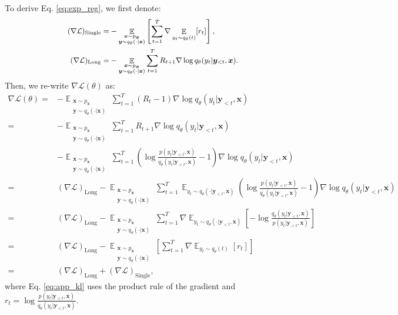 \documentclass{article}
\def\expct{\mathop{\mathbb{E}}}
\def\pst{q_{\theta}(y_t | \by_{<t}, \bx)}
\def\ptt{p(y_t | \by_{<t}, \bx)}
\def\ps{q_\theta}
\def\bx{\bm{x}}
\def\by{\bm{y}}
\begin{document}
To derive Eq. \ref{eq:exp_reg}, we first denote: 
\begin{equation}
    \small
    \begin{aligned}
    (\nabla \mathcal{L})_{\text{Single}}=&-\expct_{\substack{\bx \sim p_{\bx} \\ \by \sim \ps (\cdot | \bx)}} \left[ \sum_{t=1}^T\nabla \expct_{y_t \sim q_\theta (t)}[r_t]\right], \\
    (\nabla \mathcal{L})_{\text{Long}} =& -\expct_{\substack{\bx \sim p_{\bx} \\ \by \sim \ps (\cdot | \bx)}} \sum_{t=1}^T R_{t+1} \nabla \log \pst.
\end{aligned}
\end{equation}
Then, we re-write $\nabla \mathcal{L}(\theta)$ as:
{\small
\begin{align}
    \nabla \mathcal{L}(\theta) 
    =& -\expct_{\substack{\bx \sim p_{\bx} \\ \by \sim \ps (\cdot | \bx)}} \sum_{t=1}^T (R_t - 1) \nabla \log \pst \\
    =& -\expct_{\substack{\bx \sim p_{\bx} \\ \by \sim \ps (\cdot | \bx)}} \sum_{t=1}^T R_{t+1} \nabla \log \pst \\
    &- \expct_{\substack{\bx \sim p_{\bx} \\ \by \sim \ps (\cdot | \bx)}} \sum_{t=1}^T \left(\log \frac{\ptt}{\pst}-1 \right) \nabla \log \pst \\
    =& (\nabla \mathcal{L})_{\text{Long}} - \expct_{\substack{\bx \sim p_{\bx} \\ \by \sim \ps (\cdot | \bx)}} \sum_{t=1}^T \expct_{y_t \sim \ps (\cdot | \by_{<t}, \bx)} \left(\log \frac{\ptt}{\pst}-1 \right) \nabla \log \pst \\ \label{eq:app_kl}
    =& (\nabla \mathcal{L})_{\text{Long}} - \expct_{\substack{\bx \sim p_{\bx} \\ \by \sim \ps (\cdot | \bx)}} \sum_{t=1}^T \nabla \expct_{y_t \sim \ps (\cdot | \by_{<t}, \bx)} \left[- \log \frac{\pst}{\ptt}\right] \\ 
    =& (\nabla \mathcal{L})_{\text{Long}} - \expct_{\substack{\bx \sim p_{\bx} \\ \by \sim \ps (\cdot | \bx)}} \left[ \sum_{t=1}^T\nabla \expct_{y_t \sim q_\theta (t)}[r_t]\right] \\
    =& (\nabla \mathcal{L})_{\text{Long}} + (\nabla \mathcal{L})_{\text{Single}},
\end{align}
}%
where Eq. \ref{eq:app_kl} uses the product rule of the gradient and $r_t = \log \frac{\ptt}{\pst}$.
\end{document}
